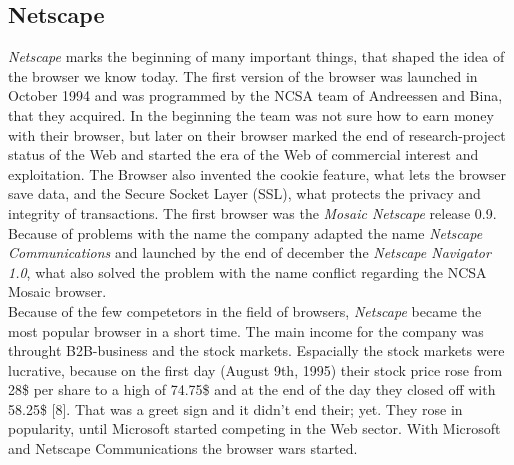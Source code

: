 \documentclass[runningheads]{llncs}
\begin{document}
		\subsection{Netscape}
		\textit{Netscape} marks the beginning of many important things, that shaped the idea of the browser we know today. The first version of the browser was launched in October 1994 and was programmed by the NCSA team of Andreessen and Bina, that they acquired. In the beginning the team was not sure how to earn money with their browser, but later on their browser marked the end of research-project status of the Web and started the era of the Web of commercial interest and exploitation. The Browser also invented the cookie feature, what lets the browser save data, and the Secure Socket Layer (SSL), what protects the privacy  and integrity of transactions. The first browser was the \textit{Mosaic Netscape} release 0.9. Because of problems with the name the company adapted the name \textit{Netscape Communications} and launched by the end of december the \textit{Netscape Navigator 1.0}, what also solved the problem with the name conflict regarding the NCSA Mosaic browser.
		\\Because of the few competetors in the field of browsers, \textit{Netscape} became the most popular browser in a short time. The main income for the company was throught B2B-business and the stock markets. Espacially the stock markets were lucrative, because on the first day (August 9th, 1995) their stock price rose from 28\$ per share to a high of 74.75\$ and at the end of the day they closed off with 58.25\$ [8]. That was a greet sign and it didn't end their; yet. They rose in popularity, until Microsoft started competing in the Web sector. With Microsoft and Netscape Communications the browser wars started.
\end{document}
